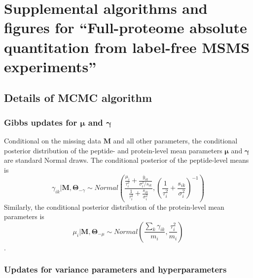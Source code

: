 


\chapter{Supplemental algorithms and figures for ``Full-proteome absolute quantitation from label-free MSMS experiments''}


\section{Details of MCMC algorithm}
\label{supp:proteomics:sec:mcmcDetails}

\subsection{Gibbs updates for $\bm \mu$ and $\bm \gamma$}
\label{supp:proteomics:sc:draw_intensity_parameters}

Conditional on the missing data $\bm M$ and all other parameters, the conditional posterior distribution of the peptide- and protein-level mean parameters $\bm \mu$ and $\bm \gamma$ are standard Normal draws.
The conditional posterior of the peptide-level means is
\begin{equation*}
\gamma_{ik} | \bm M, \bm \Theta_{-\gamma} \sim Normal\left(\frac{\frac{\mu_{i}}{\tau_{i}^{2}}+\frac{\bar{y}_{ik}}{\sigma_{i}^{2}/s_{ik}}}{\frac{1}{\tau_{i}^{2}}+\frac{s_{ik}}{\sigma_{i}^{2}}},\left(\frac{1}{\tau_{i}^{2}}+\frac{s_{ik}}{\sigma_{i}^{2}}\right)^{-1}\right)
\end{equation*}
Similarly, the conditional posterior distribution of the protein-level mean parameters is
\begin{equation*}
\mu_{i} | \bm M, \bm \Theta_{-\mu} \sim Normal\left(\frac{\sum_{k}\gamma_{ik}}{m_{i}},\frac{\tau_{i}^{2}}{m_{i}}\right)
\end{equation*}
. 

\subsection{Updates for variance parameters and hyperparameters}


